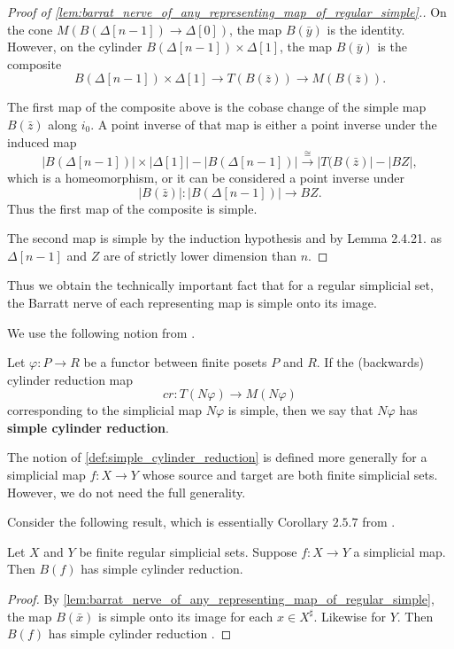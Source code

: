 \begin{proof}[Proof of \cref{lem:barrat_nerve_of_any_representing_map_of_regular_simple}.]
On the cone $M(B(\Delta [n-1])\to \Delta [0])$, the map $B(\bar{y})$ is the identity. However, on the cylinder $B(\Delta [n-1])\times \Delta [1]$, the map $B(\bar{y})$ is the composite
\[B(\Delta [n-1])\times \Delta [1]\to T(B(\bar{z} ))\to M(B(\bar{z} )).\]

The first map of the composite above is the cobase change of the simple map $B(\bar{z} )$ along $i_0$. A point inverse of that map is either a point inverse under the induced map
\[\lvert B(\Delta [n-1])\rvert \times \lvert \Delta [1]\rvert -\lvert B(\Delta [n-1])\rvert \xrightarrow{\cong } \lvert T(B(\bar{z} )\rvert -\lvert BZ\rvert ,\]
which is a homeomorphism, or it can be considered a point inverse under
\[\lvert B(\bar{z} )\rvert :\lvert B(\Delta [n-1])\rvert \to  BZ.\]
Thus the first map of the composite is simple.

The second map is simple by the induction hypothesis and by Lemma 2.4.21. \cite[p.~67]{WJR13} as $\Delta [n-1]$ and $Z$ are of strictly lower dimension than $n$.
\end{proof}
\noindent Thus we obtain the technically important fact that for a regular simplicial set, the Barratt nerve of each representing map is simple onto its image.

We use the following notion from \cite[Def.~2.4.9]{WJR13}.
\begin{definition}
\label{def:simple_cylinder_reduction}
Let $\varphi :P\to R$ be a functor between finite posets $P$ and $R$. If the (backwards) cylinder reduction map
\[cr:T(N\varphi )\to M(N\varphi )\]
corresponding to the simplicial map $N\varphi $ is simple, then we say that $N\varphi $ has \textbf{simple cylinder reduction}.
\end{definition}
\noindent The notion of \cref{def:simple_cylinder_reduction} is defined more generally for a simplicial map $f:X\to Y$ whose source and target are both finite simplicial sets. However, we do not need the full generality.

Consider the following result, which is essentially Corollary $2.5.7$ from \cite[p.~71]{WJR13}.
\begin{proposition}\label{prop:map_between_regular_reduction_map_simple}
Let $X$ and $Y$ be finite regular simplicial sets. Suppose $f:X\to Y$ a simplicial map. Then $B(f)$ has simple cylinder reduction.
\end{proposition}
\begin{proof}
By \cref{lem:barrat_nerve_of_any_representing_map_of_regular_simple}, the map $B(\bar{x} )$ is simple onto its image for each $x\in X^\sharp$. Likewise for $Y$. Then $B(f)$ has simple cylinder reduction \cite[Lem.~2.4.21]{WJR13}.
\end{proof}


